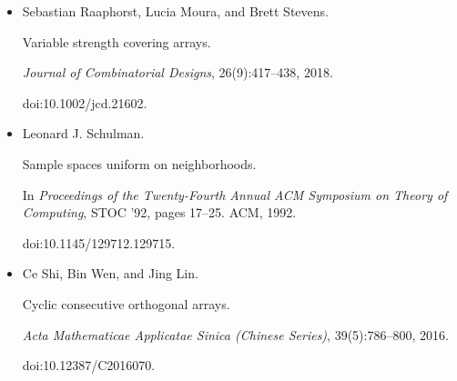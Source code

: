 \documentclass[10pt,a4paper]{article}
\begin{document}
\begin{itemize}
\emph{Theoretical Computer Science}, 800:146–154, 2019.


doi:10.1016/j.tcs.2019.10.022.





\item[] 
[18]

Sebastian Raaphorst, Lucia Moura, and Brett Stevens.


Variable strength covering arrays.


\emph{Journal of Combinatorial Designs}, 26(9):417–438, 2018.


doi:10.1002/jcd.21602.





\item[] 
[19]

Leonard J. Schulman.


Sample spaces uniform on neighborhoods.


In \emph{Proceedings of the Twenty-Fourth Annual ACM Symposium on
Theory of Computing}, STOC ’92, pages 17–25. ACM, 1992.


doi:10.1145/129712.129715.





\item[] 
[20]

Ce Shi, Bin Wen, and Jing Lin.


Cyclic consecutive orthogonal arrays.


\emph{Acta Mathematicae Applicatae Sinica (Chinese Series)},
39(5):786–800, 2016.


doi:10.12387/C2016070.





\end{itemize}
\end{document}
